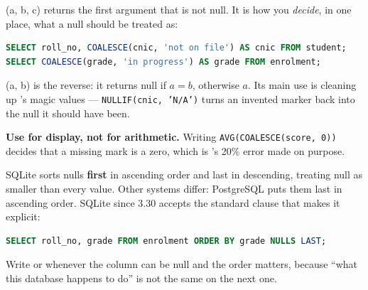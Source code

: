 \begin{examplebox}
(a, b, c) returns the first argument that is not null. It is
how you \emph{decide}, in one place, what a null should be treated as:

\begin{lstlisting}[language=sql]
SELECT roll_no, COALESCE(cnic, 'not on file') AS cnic FROM student;
SELECT COALESCE(grade, 'in progress') AS grade FROM enrolment;
\end{lstlisting}

(a, b) is the reverse: it returns null if $a = b$, otherwise
$a$. Its main use is cleaning up 's magic values ---
\texttt{NULLIF(cnic, 'N/A')} turns an invented marker back into the null it
should have been.

\smallskip
\textbf{Use  for display, not for arithmetic.} Writing
\texttt{AVG(COALESCE(score, 0))} decides that a missing mark is a zero, which
is 's 20\% error made on purpose.
\end{examplebox}

\begin{conceptbox}
SQLite sorts nulls \textbf{first} in ascending order and last in descending,
treating null as smaller than every value. Other systems differ: PostgreSQL
puts them last in ascending order. SQLite since 3.30 accepts the standard
clause that makes it explicit:

\begin{lstlisting}[language=sql]
SELECT roll_no, grade FROM enrolment ORDER BY grade NULLS LAST;
\end{lstlisting}

Write  or  whenever the column can be
null and the order matters, because ``what this database happens to do'' is
not the same on the next one.
\end{conceptbox}

